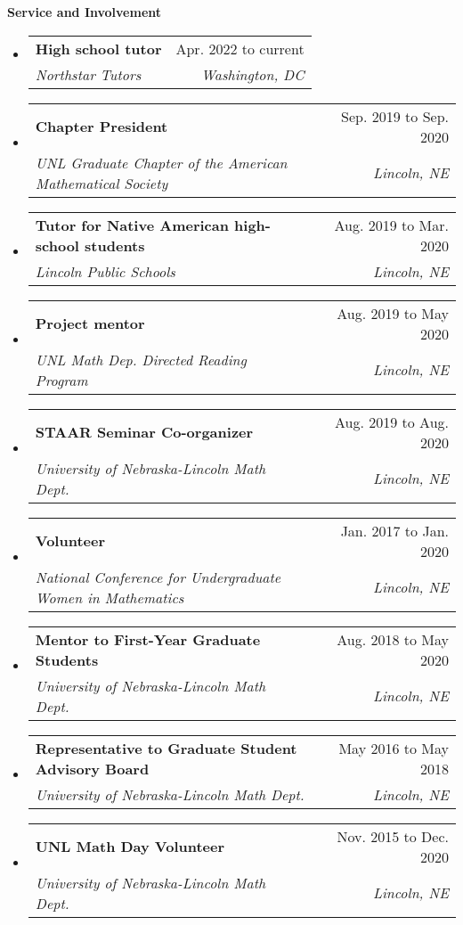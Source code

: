 \documentclass[letterpaper,11pt]{article}
\makeatletter
\newcommand{\resheading}[1]{{\large \colorbox{mygrey}{\begin{minipage}{\textwidth}{\textbf{#1 \vphantom{p\^{E}}}}\end{minipage}}}}
\newcommand{\ressubheading}[4]{
\begin{tabular*}{6.5in}{l@{\extracolsep{\fill}}r}
		\textbf{#1} & #2 \\
		\textit{#3} & \textit{#4} \\
\end{tabular*}\vspace{-6pt}}
\makeatother
\begin{document}
\begin{samepage}	
\resheading{Service and Involvement}
	\begin{itemize}
		\item
			\ressubheading{High school tutor}{Apr. 2022 to current}{Northstar Tutors}{Washington, DC}
		\item
			\ressubheading{Chapter President}{Sep. 2019 to Sep. 2020}{UNL Graduate Chapter of the American Mathematical Society}{Lincoln, NE}
		\item 
			\ressubheading{Tutor for Native American high-school students}{Aug. 2019 to Mar. 2020}{Lincoln Public Schools}{Lincoln, NE}
		\item
			\ressubheading{Project mentor}{Aug. 2019 to May 2020}{UNL Math Dep. Directed Reading Program}{Lincoln, NE}
		\item
			\ressubheading{STAAR Seminar Co-organizer}{Aug. 2019 to Aug. 2020}{University of Nebraska-Lincoln Math Dept.}{Lincoln, NE}
		\item
			\ressubheading{Volunteer}{Jan. 2017 to Jan. 2020}{National Conference for Undergraduate Women in Mathematics}{Lincoln, NE}
		\item
			\ressubheading{Mentor to First-Year Graduate Students}{Aug. 2018 to May 2020}{University of Nebraska-Lincoln Math Dept.}{Lincoln, NE}
		\item
			\ressubheading{Representative to Graduate Student Advisory Board}{May 2016 to May 2018}{University of Nebraska-Lincoln Math Dept.}{Lincoln, NE}
		\item
			\ressubheading{UNL Math Day Volunteer}{Nov. 2015 to Dec. 2020}{University of Nebraska-Lincoln Math Dept.}{Lincoln, NE}
		
	\end{itemize}			
\end{samepage}
			
%
\end{document}
